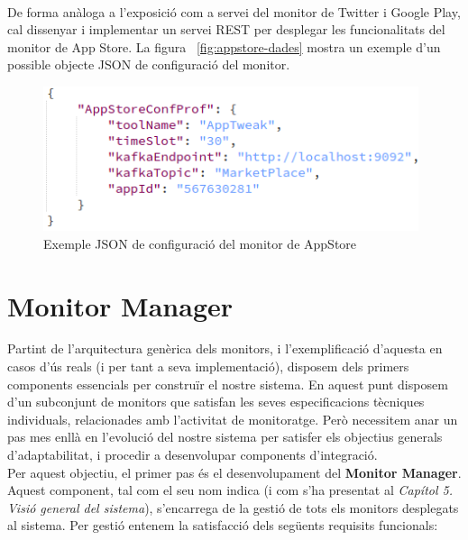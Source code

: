 \\

De forma anàloga a l'exposició com a servei del monitor de Twitter i Google Play, cal dissenyar i implementar un servei REST per desplegar les funcionalitats del monitor de App Store. La figura ~\ref{fig:appstore-dades} mostra un exemple d'un possible objecte JSON de configuració del monitor.\\

\begin{figure}[!h]
\centering
\includegraphics[width=11cm]{Figures/appstore-conf}
\decoRule
\caption[Exemple JSON de configuració del monitor de AppStore]{Exemple JSON de configuració del monitor de AppStore}
\label{fig:appstore-conf}
\end{figure}

\section{Monitor Manager}

Partint de l'arquitectura genèrica dels monitors, i l'exemplificació d'aquesta en casos d'ús reals (i per tant a seva implementació), disposem dels primers components essencials per construïr el nostre sistema. En aquest punt disposem d'un subconjunt de monitors que satisfan les seves especificacions tècniques individuals, relacionades amb l'activitat de monitoratge. Però necessitem anar un pas mes enllà en l'evolució del nostre sistema per satisfer els objectius generals d'adaptabilitat, i procedir a desenvolupar components d'integració.\\

Per aquest objectiu, el primer pas és el desenvolupament del \textbf{Monitor Manager}. Aquest component, tal com el seu nom indica (i com s'ha presentat al \textit{Capítol 5. Visió general del sistema}), s'encarrega de la gestió de tots els monitors desplegats al sistema. Per gestió entenem la satisfacció dels següents requisits funcionals:

